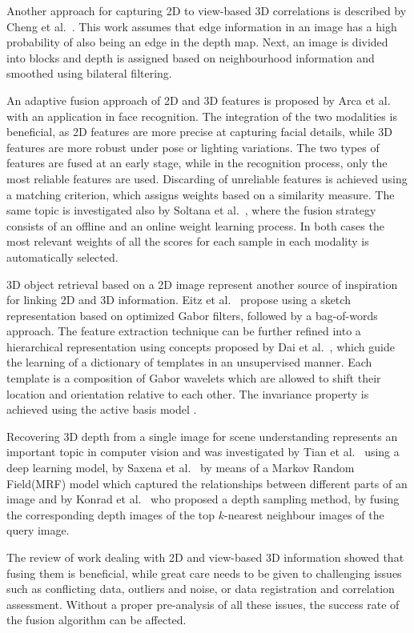 \documentclass[runningheads]{llncs}
\begin{document}
Another approach for capturing 2D to view-based 3D correlations is described by Cheng et al.~\cite{Cheng2010}. This work assumes that edge information in an image has a high probability of also being an edge in the depth map. Next, an image is divided into blocks and depth is assigned based on neighbourhood information and smoothed using bilateral filtering.

An adaptive fusion approach of 2D and 3D features is proposed by Arca et al.~\cite{Arca2007} with an application in face recognition. The integration of the two modalities is beneficial, as 2D features are more precise at capturing facial details, while 3D features are more robust under pose or lighting variations. The two types of features are fused at an early stage, while in the recognition process, only the most reliable features are used. Discarding of unreliable features is achieved using a matching criterion, which assigns weights based on a similarity measure. The same topic is investigated also by Soltana et al.~\cite{Soltana2010}, where the fusion strategy consists of an offline and an online weight learning process. In both cases the most relevant weights of all the scores for each sample in each modality is automatically selected.

3D object retrieval based on a 2D image represent another source of inspiration for linking 2D and 3D information. Eitz et al.~\cite{Eitz2012} propose using a sketch representation based on optimized Gabor filters, followed by a bag-of-words approach. The feature extraction technique can be further refined into a hierarchical representation using concepts proposed by Dai et al.~\cite{Dai2014}, which guide the learning of a dictionary of templates in an unsupervised manner. Each template is a composition of Gabor wavelets which are allowed to shift their location and orientation relative to each other. The invariance property is achieved using the active basis model \cite{Wu2010}.

Recovering 3D depth from a single image for scene understanding represents an important topic in computer vision and was investigated by Tian et al.~\cite{Tian2014} using a deep learning model, by Saxena et al.~\cite{Saxena2009} by means of a Markov Random Field(MRF) model which captured the relationships between different parts of an image and by Konrad et al.~\cite{Konrad2012} who proposed a depth sampling method, by fusing the corresponding depth images of the top $k$-nearest neighbour images of the query image.

The review of work dealing with 2D and view-based 3D information showed that fusing them is beneficial, while great care needs to be given to challenging issues such as conflicting data, outliers and noise, or data registration and correlation assessment. Without a proper pre-analysis of all these issues, the success rate of the fusion algorithm can be affected. 
\end{document}
